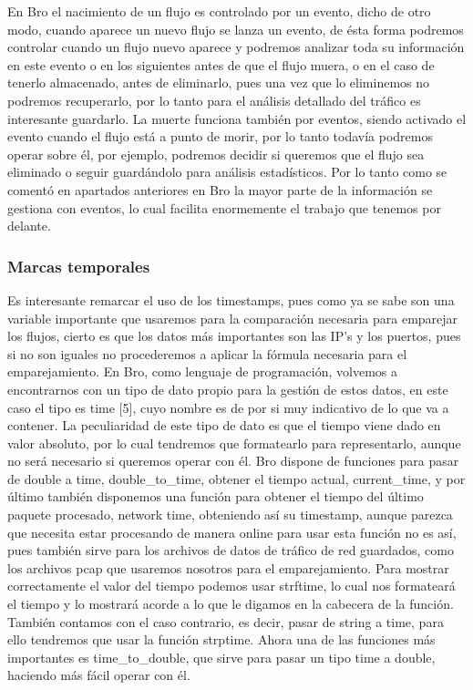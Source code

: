 En Bro el nacimiento de un flujo es controlado por un evento, dicho de otro 
modo, cuando aparece un nuevo flujo se lanza un evento, de ésta forma podremos 
controlar cuando un flujo nuevo aparece y podremos analizar toda su información 
en este evento o en los siguientes antes de que el flujo muera, o en el caso de 
tenerlo almacenado, antes de eliminarlo, pues una vez que lo eliminemos no 
podremos recuperarlo, por lo tanto para el análisis detallado del tráfico es 
interesante guardarlo.
\intro
La muerte funciona también por eventos, siendo activado el evento cuando el 
flujo está a punto de morir, por lo tanto todavía podremos operar sobre él, 
por ejemplo, podremos decidir si queremos que el flujo sea eliminado o seguir 
guardándolo para análisis estadísticos.
\intro
Por lo tanto como se comentó en apartados anteriores en Bro la mayor parte de 
la información se gestiona con eventos, lo cual facilita enormemente el trabajo 
que tenemos por delante.

\subsubsection{Marcas temporales}

Es interesante remarcar el uso de los timestamps, pues como ya se sabe son una 
variable importante que usaremos para la comparación necesaria para emparejar 
los flujos, cierto es que los datos más importantes son las IP’s y los puertos, 
pues si no son iguales no procederemos a aplicar la fórmula necesaria para el 
emparejamiento.
\intro
En Bro, como lenguaje de programación, volvemos a encontrarnos con un tipo de 
dato propio para la gestión de estos datos, en este caso el tipo es time [5], 
cuyo nombre es de por si muy indicativo de lo que va a contener. La peculiaridad 
de este tipo de dato es que el tiempo viene dado en valor absoluto, por lo cual 
tendremos que formatearlo para representarlo, aunque no será necesario si 
queremos operar con él. Bro dispone de funciones para pasar de double a time, double\_to\_time, 
obtener el tiempo actual, current\_time, y por último también disponemos una 
función para obtener el tiempo del último paquete procesado, network time, 
obteniendo así su timestamp, aunque parezca que necesita estar procesando de 
manera online para usar esta función no es así, pues también sirve para los 
archivos de datos de tráfico de red guardados, como los archivos pcap que 
usaremos nosotros para el emparejamiento. Para mostrar correctamente el valor 
del tiempo podemos usar strftime, lo cual nos formateará el tiempo y lo mostrará 
acorde a lo que le digamos en la cabecera de la función. También contamos con el 
caso contrario, es decir, pasar de string a time, para ello tendremos que usar la 
función strptime.
\intro
Ahora una de las funciones más importantes es time\_to\_double, que sirve para pasar 
un tipo time a double, haciendo más fácil operar con él.

